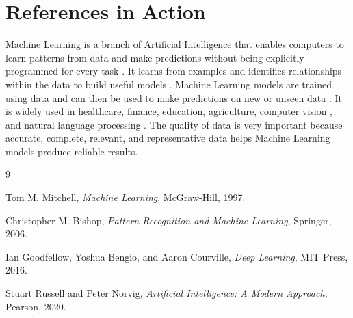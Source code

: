 \documentclass{article}
\begin{document}
	
	\section{References in Action}
	
	Machine Learning is a branch of Artificial Intelligence that enables computers to learn patterns from data and make predictions without being explicitly programmed for every task \cite{mitchell}. It learns from examples and identifies relationships within the data to build useful models \cite{bishop}. Machine Learning models are trained using data and can then be used to make predictions on new or unseen data \cite{goodfellow}. It is widely used in healthcare, finance, education, agriculture, computer vision \cite{russell}, and natural language processing \cite{russell}. The quality of data is very important because accurate, complete, relevant, and representative data helps Machine Learning models produce reliable results.
	
	\begin{thebibliography}{9}
		
		Tom M. Mitchell,
		\textit{Machine Learning},
		McGraw-Hill, 1997.
		
		Christopher M. Bishop,
		\textit{Pattern Recognition and Machine Learning},
		Springer, 2006.
		
		Ian Goodfellow, Yoshua Bengio, and Aaron Courville,
		\textit{Deep Learning},
		MIT Press, 2016.
		
		Stuart Russell and Peter Norvig,
		\textit{Artificial Intelligence: A Modern Approach},
		Pearson, 2020.
		
	\end{thebibliography}
	
\end{document}
